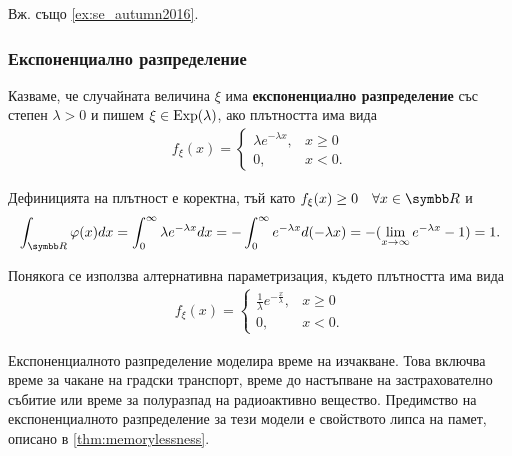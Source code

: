 \documentclass[
  headings=standardclasses,
  bibliography=totocnumbered,
]{scrartcl}
\begin{document}
Вж. също \cref{ex:se_autumn2016}.

\subsubsection{Експоненциално разпределение}\label{sec:exp}

\begin{definition}
  Казваме, че случайната величина \( \xi \) има \textbf{експоненциално разпределение} със степен \( \lambda > 0 \) и пишем \( \xi \in \operatorname{Exp}(\lambda) \), ако плътността има вида
  \begin{align*}
    f_\xi(x) = \begin{cases}
      \lambda e^{-\lambda x}, & x \geq 0 \\
      0, &x < 0.
    \end{cases}
  \end{align*}

  Дефиницията на плътност е коректна, тъй като \( f_\xi(x) \geq 0\quad\forall x \in \R \) и
  \begin{equation*}
    \int_{\R} \varphi(x) dx
    =
    \int_0^\infty \lambda e^{-\lambda x} dx
    =
    -\int_0^\infty e^{-\lambda x} d(-\lambda x)
    =
    -(\lim_{x \to \infty} e^{-\lambda x} - 1)
    =
    1.
  \end{equation*}

  Понякога се използва алтернативна параметризация, където плътността има вида
  \begin{align*}
    f_\xi(x) = \begin{cases}
      \frac 1 \lambda e^{-\frac x \lambda}, & x \geq 0 \\
      0, &x < 0.
    \end{cases}
  \end{align*}
\end{definition}

Експоненциалното разпределение моделира време на изчакване. Това включва време за чакане на градски транспорт, време до настъпване на застрахователно събитие или време за полуразпад на радиоактивно вещество. Предимство на експоненциалното разпределение за тези модели е свойството липса на памет, описано в \cref{thm:memorylessness}.
\end{document}
